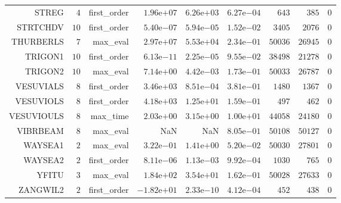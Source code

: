 \begin{longtable}{rrrrrrrrr}
STREG & \(     4\) & first\_order & \( 1.96\)e\(+07\) & \( 6.26\)e\(+03\) & \( 6.27\)e\(-04\) & \(   643\) & \(   385\) & \(     0\) \\
STRTCHDV & \(    10\) & first\_order & \( 5.40\)e\(-07\) & \( 5.94\)e\(-05\) & \( 1.52\)e\(-02\) & \(  3405\) & \(  2076\) & \(     0\) \\
THURBERLS & \(     7\) & max\_eval & \( 2.97\)e\(+07\) & \( 5.53\)e\(+04\) & \( 2.34\)e\(-01\) & \( 50036\) & \( 26945\) & \(     0\) \\
TRIGON1 & \(    10\) & first\_order & \( 6.13\)e\(-11\) & \( 2.25\)e\(-05\) & \( 9.55\)e\(-02\) & \( 38498\) & \( 21278\) & \(     0\) \\
TRIGON2 & \(    10\) & max\_eval & \( 7.14\)e\(+00\) & \( 4.42\)e\(-03\) & \( 1.73\)e\(-01\) & \( 50033\) & \( 26787\) & \(     0\) \\
VESUVIALS & \(     8\) & first\_order & \( 3.46\)e\(+03\) & \( 8.51\)e\(-04\) & \( 3.81\)e\(-01\) & \(  1480\) & \(  1367\) & \(     0\) \\
VESUVIOLS & \(     8\) & first\_order & \( 4.18\)e\(+03\) & \( 1.25\)e\(+01\) & \( 1.59\)e\(-01\) & \(   497\) & \(   462\) & \(     0\) \\
VESUVIOULS & \(     8\) & max\_time & \( 2.03\)e\(+00\) & \( 3.15\)e\(+00\) & \( 1.00\)e\(+01\) & \( 44058\) & \( 24180\) & \(     0\) \\
VIBRBEAM & \(     8\) & max\_eval &       NaN &       NaN & \( 8.05\)e\(-01\) & \( 50108\) & \( 50127\) & \(     0\) \\
WAYSEA1 & \(     2\) & max\_eval & \( 3.22\)e\(-01\) & \( 1.41\)e\(+00\) & \( 5.20\)e\(-02\) & \( 50030\) & \( 27801\) & \(     0\) \\
WAYSEA2 & \(     2\) & first\_order & \( 8.11\)e\(-06\) & \( 1.13\)e\(-03\) & \( 9.92\)e\(-04\) & \(  1030\) & \(   765\) & \(     0\) \\
YFITU & \(     3\) & max\_eval & \( 1.84\)e\(+02\) & \( 3.54\)e\(+01\) & \( 1.62\)e\(-01\) & \( 50028\) & \( 27633\) & \(     0\) \\
ZANGWIL2 & \(     2\) & first\_order & \(-1.82\)e\(+01\) & \( 2.33\)e\(-10\) & \( 4.12\)e\(-04\) & \(   452\) & \(   438\) & \(     0\) \\\hline
\end{longtable}
